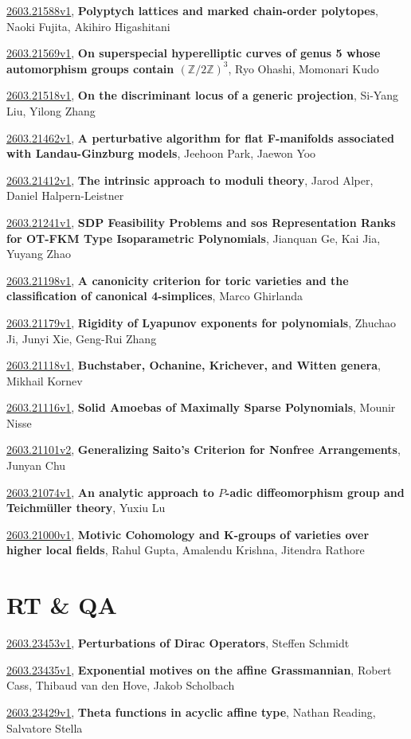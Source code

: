 \documentclass[9pt, a4paper]{article}
\theoremstyle{plain}
\theoremstyle{definition}
\theoremstyle{remark}
\newcommand{\arxiv}[3]{\href{https://arxiv.org/abs/#1}{#1}, \textbf{\textcolor{arxivblue}{#2}}, #3}
\begin{document}
\arxiv{2603.21588v1}{Polyptych lattices and marked chain-order polytopes}{Naoki Fujita, Akihiro Higashitani}

\arxiv{2603.21569v1}{On superspecial hyperelliptic curves of genus 5 whose automorphism groups contain $(\mathbb{Z}/2\mathbb{Z})^3$}{Ryo Ohashi, Momonari Kudo}

\arxiv{2603.21518v1}{On the discriminant locus of a generic projection}{Si-Yang Liu, Yilong Zhang}

\arxiv{2603.21462v1}{A perturbative algorithm for flat F-manifolds associated with Landau-Ginzburg models}{Jeehoon Park, Jaewon Yoo}

\arxiv{2603.21412v1}{The intrinsic approach to moduli theory}{Jarod Alper, Daniel Halpern-Leistner}

\arxiv{2603.21241v1}{SDP Feasibility Problems and sos Representation Ranks for OT-FKM Type Isoparametric Polynomials}{Jianquan Ge, Kai Jia, Yuyang Zhao}

\arxiv{2603.21198v1}{A canonicity criterion for toric varieties and the classification of canonical 4-simplices}{Marco Ghirlanda}

\arxiv{2603.21179v1}{Rigidity of Lyapunov exponents for polynomials}{Zhuchao Ji, Junyi Xie, Geng-Rui Zhang}

\arxiv{2603.21118v1}{Buchstaber, Ochanine, Krichever, and Witten genera}{Mikhail Kornev}

\arxiv{2603.21116v1}{Solid Amoebas of Maximally Sparse Polynomials}{Mounir Nisse}

\arxiv{2603.21101v2}{Generalizing Saito's Criterion for Nonfree Arrangements}{Junyan Chu}

\arxiv{2603.21074v1}{An analytic approach to $P$-adic diffeomorphism group and Teichmüller theory}{Yuxiu Lu}

\arxiv{2603.21000v1}{Motivic Cohomology and K-groups of varieties over higher local fields}{Rahul Gupta, Amalendu Krishna, Jitendra Rathore}


\section{RT \& QA}
\arxiv{2603.23453v1}{Perturbations of Dirac Operators}{Steffen Schmidt}

\arxiv{2603.23435v1}{Exponential motives on the affine Grassmannian}{Robert Cass, Thibaud van den Hove, Jakob Scholbach}

\arxiv{2603.23429v1}{Theta functions in acyclic affine type}{Nathan Reading, Salvatore Stella}
\end{document}
